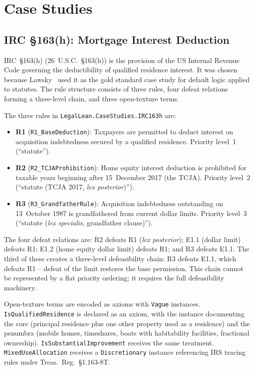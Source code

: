\documentclass[runningheads]{llncs}
\begin{document}
\section{Case Studies}

\subsection{IRC \S163(h): Mortgage Interest Deduction}

IRC~\S163(h) (26~U.S.C.~\S163(h)) is the provision of the US Internal Revenue
Code governing the deductibility of qualified residence interest. It was chosen
because Lawsky~\cite{lawsky2017logic} used it as the gold standard case study
for default logic applied to statutes. The rule structure consists of three
rules, four defeat relations forming a three-level chain, and three open-texture
terms.

The three rules in \texttt{LegalLean.CaseStudies.IRC163h} are:
\begin{itemize}
  \item \textbf{R1} (\texttt{R1\_BaseDeduction}): Taxpayers are permitted to
    deduct interest on acquisition indebtedness secured by a qualified
    residence. Priority level~1 (``statute'').
  \item \textbf{R2} (\texttt{R2\_TCJAProhibition}): Home equity interest
    deduction is prohibited for taxable years beginning after 15~December 2017
    (the TCJA). Priority level~2 (``statute (TCJA 2017, \textit{lex posterior})'').
  \item \textbf{R3} (\texttt{R3\_GrandfatherRule}): Acquisition indebtedness
    outstanding on 13~October 1987 is grandfathered from current dollar limits.
    Priority level~3 (``statute (\textit{lex specialis}, grandfather clause)'').
\end{itemize}

The four defeat relations are: R2 defeats R1 (\textit{lex posterior}); E1.1
(dollar limit) defeats R1; E1.2 (home equity dollar limit) defeats R1; and R3
defeats E1.1. The third of these creates a three-level defeasibility chain:
R3 defeats E1.1, which defeats R1 -- defeat of the limit restores the base
permission. This chain cannot be represented by a flat priority ordering; it
requires the full defeasibility machinery.

Open-texture terms are encoded as axioms with \texttt{Vague} instances.
\texttt{IsQualifiedResidence} is declared as an axiom, with the instance
documenting the core (principal residence plus one other property used as a
residence) and the penumbra (mobile homes, timeshares, boats with habitability
facilities, fractional ownership). \texttt{IsSubstantialImprovement} receives
the same treatment. \texttt{MixedUseAllocation} receives a
\texttt{Discretionary} instance referencing IRS tracing rules under
Treas.~Reg.~\S1.163-8T.
\end{document}
